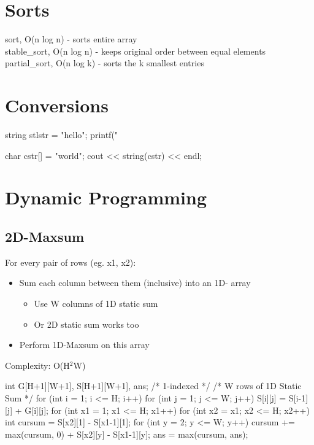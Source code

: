 \documentclass{article}
\begin{document}
\section{Sorts}
sort, O(n log n)            -   sorts entire array\\
stable\_sort, O(n log n)    -   keeps original order between equal elements\\
partial\_sort, O(n log k)   -   sorts the k smallest entries

\section{Conversions}
\begin{mylisting}{}
string stlstr = "hello";
printf("%

char cstr[] = "world";
cout << string(cstr) << endl;
\end{mylisting}

\section{Dynamic Programming}
\subsection{2D-Maxsum}
For every pair of rows (eg. x1, x2):
\begin{itemize}
  \item Sum each column between them (inclusive) into an 1D-
array
    \begin{itemize}
        \item Use W columns of 1D static sum
        \item Or 2D static sum works too
    \end{itemize}

  \item Perform 1D-Maxsum on this array
\end{itemize}
Complexity: O(H$^2$W)

\begin{mylisting}{}
int G[H+1][W+1], S[H+1][W+1], ans; /* 1-indexed */
/* W rows of 1D Static Sum */
for (int i = 1; i <= H; i++) 
    for (int j = 1; j <= W; j++) 
        S[i][j] = S[i-1][j] + G[i][j];
for (int x1 = 1; x1 <= H; x1++) {
    for (int x2 = x1; x2 <= H; x2++) {
        int cursum = S[x2][1] - S[x1-1][1];
        for (int y = 2; y <= W; y++) {
            cursum += max(cursum, 0) + S[x2][y] - S[x1-1][y];
            ans = max(cursum, ans);
        }
    }
}
\end{mylisting}
\end{document}
